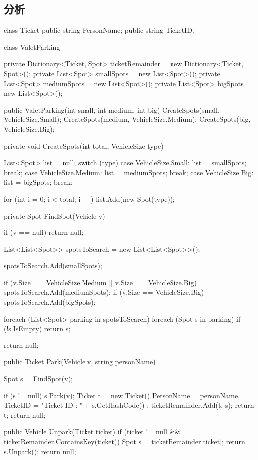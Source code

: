 \subsection{分析}
\begin{Code}
	class Ticket {
		public string PersonName;
		public string TicketID;
	}
	
	class ValetParking{
		private Dictionary<Ticket, Spot> ticketRemainder = new Dictionary<Ticket, Spot>();
		private List<Spot> smallSpots = new List<Spot>();
		private List<Spot> mediumSpots = new List<Spot>();
		private List<Spot> bigSpots = new List<Spot>();
		
		public ValetParking(int small, int medium, int big) {
			CreateSpots(small, VehicleSize.Small);
			CreateSpots(medium, VehicleSize.Medium);
			CreateSpots(big, VehicleSize.Big);
		}
		
		private void CreateSpots(int total, VehicleSize type) {
			List<Spot> list = null;
			switch (type) {
				case VehicleSize.Small:{
					list = smallSpots; break;
				}
				case VehicleSize.Medium:{
					list = mediumSpots; break;
				}
				case VehicleSize.Big:{
					list = bigSpots; break;
				}
			}
			
			for (int i = 0; i < total; i++){
				list.Add(new Spot(type));
			}
		}
		
		private Spot FindSpot(Vehicle v) {
			if (v == null) return null;
			
			List<List<Spot>> spotsToSearch = new List<List<Spot>>();
			
			spotsToSearch.Add(smallSpots);
			
			if (v.Size == VehicleSize.Medium || v.Size == VehicleSize.Big) {
				spotsToSearch.Add(mediumSpots);
			}
			if (v.Size == VehicleSize.Big){
				spotsToSearch.Add(bigSpots);
			}
			
			foreach (List<Spot> parking in spotsToSearch) {
				foreach (Spot s in parking){
					if (!s.IsEmpty) {
						return s;
					}
				}
			}
			
			return null;
		}
		
		public Ticket Park(Vehicle v, string personName) {
			
			Spot s = FindSpot(v);
			
			if (s != null) {
				s.Park(v);
				Ticket t = new Ticket() { PersonName = personName, TicketID = "Ticket ID : " + s.GetHashCode() };
				ticketRemainder.Add(t, s);	
				return t;
			}
			return null;
		}
		
		public Vehicle Unpark(Ticket ticket) {
			if (ticket != null && ticketRemainder.ContainsKey(ticket)) {
				Spot s = ticketRemainder[ticket];
				return s.Unpark();
			}
			return null;
		}
	}
	

\end{Code}
